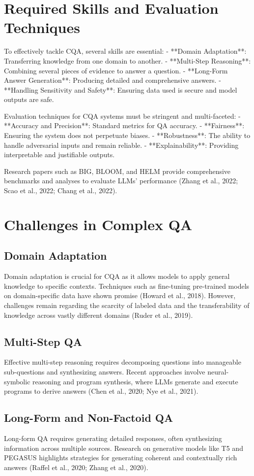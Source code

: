 \documentclass{article}
\begin{document}
\section{Required Skills and Evaluation Techniques}
To effectively tackle CQA, several skills are essential:
- **Domain Adaptation**: Transferring knowledge from one domain to another.
- **Multi-Step Reasoning**: Combining several pieces of evidence to answer a question.
- **Long-Form Answer Generation**: Producing detailed and comprehensive answers.
- **Handling Sensitivity and Safety**: Ensuring data used is secure and model outputs are safe.

Evaluation techniques for CQA systems must be stringent and multi-faceted:
- **Accuracy and Precision**: Standard metrics for QA accuracy.
- **Fairness**: Ensuring the system does not perpetuate biases.
- **Robustness**: The ability to handle adversarial inputs and remain reliable.
- **Explainability**: Providing interpretable and justifiable outputs.

Research papers such as BIG, BLOOM, and HELM provide comprehensive benchmarks and analyses to evaluate LLMs' performance (Zhang et al., 2022; Scao et al., 2022; Chang et al., 2022).

\section{Challenges in Complex QA}
\subsection{Domain Adaptation}
Domain adaptation is crucial for CQA as it allows models to apply general knowledge to specific contexts. Techniques such as fine-tuning pre-trained models on domain-specific data have shown promise (Howard et al., 2018). However, challenges remain regarding the scarcity of labeled data and the transferability of knowledge across vastly different domains (Ruder et al., 2019).

\subsection{Multi-Step QA}
Effective multi-step reasoning requires decomposing questions into manageable sub-questions and synthesizing answers. Recent approaches involve neural-symbolic reasoning and program synthesis, where LLMs generate and execute programs to derive answers (Chen et al., 2020; Nye et al., 2021).

\subsection{Long-Form and Non-Factoid QA}
Long-form QA requires generating detailed responses, often synthesizing information across multiple sources. Research on generative models like T5 and PEGASUS highlights strategies for generating coherent and contextually rich answers (Raffel et al., 2020; Zhang et al., 2020). 
\end{document}
